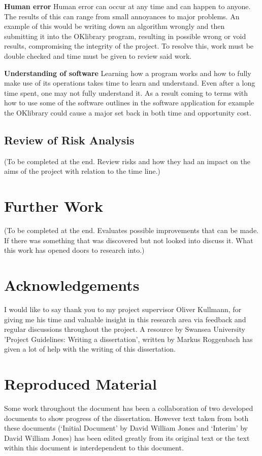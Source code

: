 \documentclass[11pt,a4paper, notitlepage]{report}
\begin{document}
\textbf{Human error}
Human error can occur at any time and can happen to anyone. The results of this can range from small annoyances to major problems. An example of this would be writing down an algorithm wrongly and then submitting it into the OKlibrary program, resulting in possible wrong or void results, compromising the integrity of the project. To resolve this, work must be double checked and time must be given to review said work.

\textbf{Understanding of software}
Learning how a program works and how to fully make use of its operations takes time to learn and understand. Even after a long time spent, one may not fully understand it. As a result coming to terms with how to use some of the software outlines in the software application for example the OKlibrary could cause a major set back in both time and opportunity cost.

\subsection{Review of Risk Analysis}
\label{subsec:ReviewOfRA}

(To be completed at the end. Review risks and how they had an impact on the aims of the project with relation to the time line.)

\section{Further Work}
\label{sec:FurtherWork}

(To be completed at the end. Evaluates possible improvements that can be made. If there was something that was discovered but not looked into discuss it. What this work has opened doors to research into.)

\section{Acknowledgements}
I would like to say thank you to my project supervisor Oliver Kullmann, for giving me his time and valuable insight in this research area via feedback and regular discussions throughout the project. A resource by Swansea University 'Project Guidelines: Writing a dissertation', written by Markus Roggenbach has given a lot of help with the writing of this dissertation.    


\section{Reproduced Material}
Some work throughout the document has been a collaboration of two developed documents to show progress of the dissertation. However text taken from both these documents (`Initial Document' by David William Jones and `Interim' by David William Jones) has been edited greatly from its original text or the text within this document is interdependent to this document. 


\nocite{*}

\end{document}
